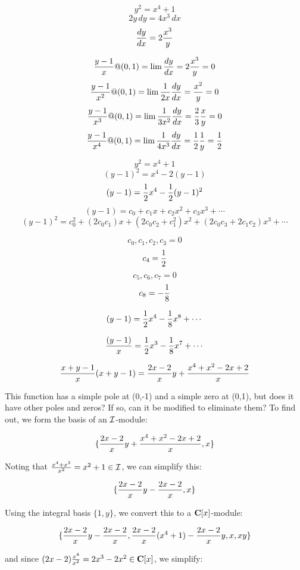 
$$y^2=x^4+1$$
$$2y\,dy=4x^3\,dx$$
$${{dy}\over{dx}} = 2{x^3\over y}$$

$${{y-1}\over{x}} @ (0,1) = \lim {{dy}\over{dx}} = 2 {{x^3}\over y} = 0$$
$${{y-1}\over{x^2}} @ (0,1) = \lim {1\over{2x}}{{dy}\over{dx}} = {{x^2}\over y} = 0$$
$${{y-1}\over{x^3}} @ (0,1) = \lim {1\over{3x^2}}{{dy}\over{dx}} = {2\over3}{{x}\over y} = 0$$
$${{y-1}\over{x^4}} @ (0,1) = \lim {1\over{4x^3}}{{dy}\over{dx}} = {1\over2}{1\over y} = {1\over2}$$


$$y^2 = x^4 + 1 $$
$$(y-1)^2 = x^4 - 2(y-1)$$
$$(y-1) = {1\over2}x^4 - {1\over2}(y-1)^2$$
$$(y-1) = c_0 + c_1 x + c_2 x^2 + c_3 x^3 + \cdots$$
$$(y-1)^2 = c_0^2 + (2 c_0 c_1) x + (2 c_0 c_2 + c_1^2) x^2 + (2 c_0 c_3 + 2 c_1 c_2) x^3 + \cdots$$

$$ c_0, c_1, c_2, c_3 = 0 $$
$$ c_4 = {1\over2}$$
$$ c_5, c_6, c_7 = 0 $$
$$ c_8 = -{1\over8} $$

$$ (y-1) = {1\over2} x^4 - {1\over8} x^8 + \cdots$$

$$ {(y-1)\over x} = {1\over2} x^3 - {1\over8} x^7 + \cdots$$


\vfill\eject
$${{x+y-1}\over x} (x+y-1) = {{2x-2}\over x} y + {{x^4+x^2-2x+2}\over x} $$

This function has a simple pole at (0,-1) and a simple zero at (0,1),
but does it have other poles and zeros?  If so, can it be modified to
eliminate them?  To find out, we form the basis of an ${\cal I}$-module:

$$\{ {{2x-2}\over x} y + {{x^4+x^2-2x+2}\over x}, x \}$$

Noting that ${{x^4+x^2}\over{x^2}} = x^2+1 \in {\cal I}$, we can simplify this:

$$\{ {{2x-2}\over x} y - {{2x-2}\over x}, x \}$$

Using the integral basis $\{1, y \}$, we convert this to a
${\bf C}[x]$-module:

$$\{ {{2x-2}\over x} y - {{2x-2}\over x}, {{2x-2}\over x} (x^4+1) - {{2x-2}\over x} y, x, xy \}$$

and since $(2x-2){{x^4}\over{x^2}} = 2x^3-2x^2 \in {\bf C}[x]$, we simplify:

